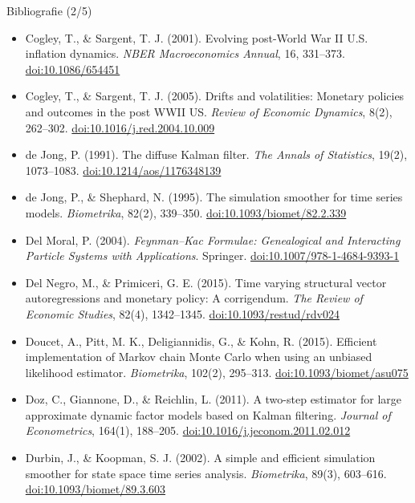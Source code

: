 \begin{frame}{Bibliografie (2/5)}
\itemsize{\tiny}
\begin{itemize}
    \item Cogley, T., \& Sargent, T. J. (2001). Evolving post-World War II U.S. inflation dynamics. \textit{NBER Macroeconomics Annual}, 16, 331--373. \href{https://doi.org/10.1086/654451}{doi:10.1086/654451}
    \item Cogley, T., \& Sargent, T. J. (2005). Drifts and volatilities: Monetary policies and outcomes in the post WWII US. \textit{Review of Economic Dynamics}, 8(2), 262--302. \href{https://doi.org/10.1016/j.red.2004.10.009}{doi:10.1016/j.red.2004.10.009}
    \item de Jong, P. (1991). The diffuse Kalman filter. \textit{The Annals of Statistics}, 19(2), 1073--1083. \href{https://doi.org/10.1214/aos/1176348139}{doi:10.1214/aos/1176348139}
    \item de Jong, P., \& Shephard, N. (1995). The simulation smoother for time series models. \textit{Biometrika}, 82(2), 339--350. \href{https://doi.org/10.1093/biomet/82.2.339}{doi:10.1093/biomet/82.2.339}
    \item Del Moral, P. (2004). \textit{Feynman--Kac Formulae: Genealogical and Interacting Particle Systems with Applications}. Springer. \href{https://doi.org/10.1007/978-1-4684-9393-1}{doi:10.1007/978-1-4684-9393-1}
    \item Del Negro, M., \& Primiceri, G. E. (2015). Time varying structural vector autoregressions and monetary policy: A corrigendum. \textit{The Review of Economic Studies}, 82(4), 1342--1345. \href{https://doi.org/10.1093/restud/rdv024}{doi:10.1093/restud/rdv024}
    \item Doucet, A., Pitt, M. K., Deligiannidis, G., \& Kohn, R. (2015). Efficient implementation of Markov chain Monte Carlo when using an unbiased likelihood estimator. \textit{Biometrika}, 102(2), 295--313. \href{https://doi.org/10.1093/biomet/asu075}{doi:10.1093/biomet/asu075}
    \item Doz, C., Giannone, D., \& Reichlin, L. (2011). A two-step estimator for large approximate dynamic factor models based on Kalman filtering. \textit{Journal of Econometrics}, 164(1), 188--205. \href{https://doi.org/10.1016/j.jeconom.2011.02.012}{doi:10.1016/j.jeconom.2011.02.012}
    \item Durbin, J., \& Koopman, S. J. (2002). A simple and efficient simulation smoother for state space time series analysis. \textit{Biometrika}, 89(3), 603--616. \href{https://doi.org/10.1093/biomet/89.3.603}{doi:10.1093/biomet/89.3.603}

\end{itemize}
\end{frame}
